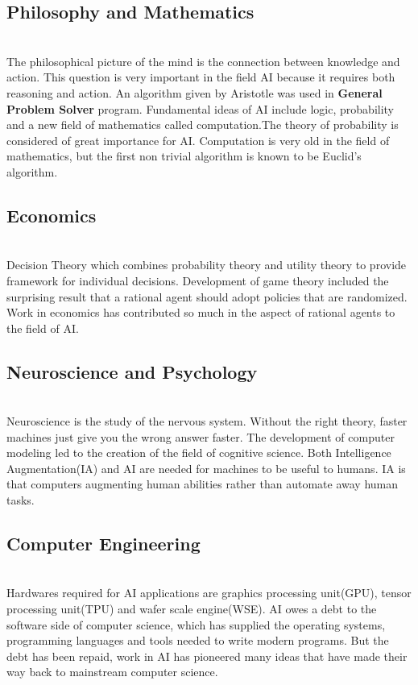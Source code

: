 \documentclass{article}
\begin{document}
\subsection{Philosophy and Mathematics}
\begin{paragraph}
\\
The philosophical picture of the mind is the connection between knowledge and 
action. This question is very important in the field AI because it requires both reasoning and action. An algorithm given by Aristotle was used in  \textbf{General Problem Solver} program. Fundamental ideas of AI include logic, probability and a new field of mathematics called computation.The theory of probability is considered of great importance for AI. Computation is very old in the field of mathematics, but the first non trivial algorithm is known to be Euclid's algorithm.
\end{paragraph}
\subsection{Economics}
\begin{paragraph}
\\
Decision Theory which combines probability theory and utility theory to provide framework for individual decisions. Development of game theory included the surprising result that a rational agent should adopt policies that are randomized. Work in economics has contributed so much in the aspect of rational agents to the field of AI.
\end{paragraph}
\subsection{Neuroscience and Psychology}
\begin{paragraph}
\\
Neuroscience is the study of the nervous system. Without the right theory, faster machines just give you the wrong answer faster. The development of computer modeling led to the creation of the field of cognitive science. Both Intelligence Augmentation(IA) and AI are needed for machines to be useful to humans. IA is that computers augmenting human abilities rather than automate away human tasks.
\end{paragraph}
\subsection{Computer Engineering}
\begin{paragraph}
\\
Hardwares required for AI applications are graphics processing unit(GPU), tensor processing unit(TPU) and wafer scale engine(WSE). AI owes a debt to the software side of computer science, which has supplied the operating systems, programming languages and tools needed to write modern programs. But the debt has been repaid, work in AI has pioneered many ideas that have made their way back to mainstream computer science.
\end{paragraph}
\end{document}
